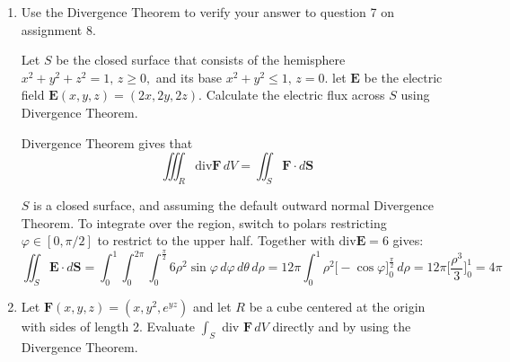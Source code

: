 \documentclass{article}
\newcommand{\divt}{\text{div}}
\begin{document}
\begin{enumerate}
\begin{enumerate}
        \begin{proof}
            \begin{align*}
                \iiint_R \nabla f \cdot \nabla g \, dV = \iint_{\partial R} f \nabla  g \cdot \boldsymbol n \, dS - \iiint_R f \nabla^2 g \, dV \\
               \iff \iiint_R \nabla f \cdot \nabla g \, dV + \iiint_R f \nabla^2 g \, dV = \iint_{\partial R} f \nabla  g \cdot \boldsymbol n \, dS \\
            \end{align*}
            \begin{align*}
                \iint_{\partial R} f \nabla  g \cdot \boldsymbol n \, dS \overset{\text{Div Thm}}{=} \iiint_R \text{div} (f \nabla g) \, dV  \overset{\text{(ii)}}{=} \iiint_R f(\text{div} \nabla g) + \nabla g \cdot \nabla f \, dV  \\
                = \iiint_R f(\text{div} \nabla g) \, dV + \iiint_R \nabla f \cdot \nabla g \, dV = \iiint_R f \nabla^2 g \, dV + \iiint_R \nabla f \cdot \nabla g \, dV \\
            \end{align*}
        \end{proof}
    \end{enumerate} 
    \newpage
    \item Use the Divergence Theorem to verify your answer to question 7 on assignment 8.

    Let $S$ be the closed surface that consists of the hemisphere $x^2+y^2+z^2 = 1,\, z \geq 0,$ and its base $x^2 + y^2 \leq 1,\, z = 0.$ let $\boldsymbol E$ be the electric field $\boldsymbol E(x,y,z) = (2x,2y,2z)$. Calculate the electric flux across $S$ using Divergence Theorem.

    Divergence Theorem gives that 
    \[\iiint_R \divt \boldsymbol F \, dV = \iint_S \boldsymbol F \cdot d\boldsymbol S\]

    $S$ is a closed surface, and assuming the default outward normal Divergence Theorem. To integrate over the region, switch to polars restricting $\varphi \in [0,\pi/2]$ to restrict to the upper half. Together with $\divt \boldsymbol E = 6$ gives:
        \[ \iint_S \boldsymbol E \cdot d\boldsymbol S = \int_0^1 \int_0^{2\pi} \int_0^{\frac{\pi}{2}} 6 \rho^2 \sin \varphi \, d\varphi \, d\theta \, d\rho  = 12 \pi \int_0^1 \rho^2 \big[ -\cos \varphi\big]_0^{\frac{\pi}{2}} \, d\rho = 12\pi\bigg[\frac{\rho^3}{3} \bigg]_0^1 = 4\pi \]

    \item Let $\boldsymbol F (x,y,z) = (x,y^2,e^{yz})$ and let $R$ be a cube centered at the origin with sides of length 2. Evaluate $\displaystyle \int_S$ div $\boldsymbol F \, dV $ directly and by using the Divergence Theorem. 


\end{enumerate}
\end{document}
